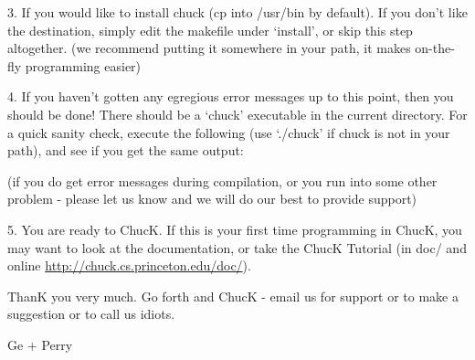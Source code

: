 
3. If you would like to install chuck (cp into /usr/bin by default). If you 
don't like the destination, simply edit the makefile under `install', or 
skip this step altogether. (we recommend putting it somewhere in your 
path, it makes on-the-fly programming easier)


4. If you haven't gotten any egregious error messages up to this point, 
then you should be done! There should be a `chuck' executable in the 
current directory. For a quick sanity check, execute the following (use 
`./chuck' if chuck is not in your path), and see if you get the same output:


(if you do get error messages during compilation, or you run into some 
other problem - please let us know and we will do our best to provide 
support) 

5. You are ready to ChucK. If this is your first time programming in 
ChucK, you may want to look at the documentation, or take the ChucK 
Tutorial (in doc/ and online 
\href{http://chuck.cs.princeton.edu/doc}{http://chuck.cs.princeton.edu/doc/}). 

ThanK you very much. Go forth and ChucK - email us for support or to make a 
suggestion or to call us idiots.

Ge + Perry
 